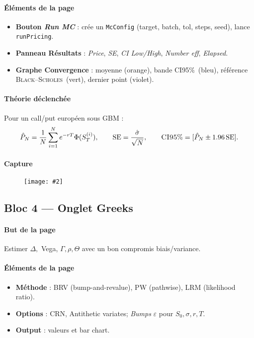 \documentclass[11pt,a4paper]{article}
\newcommand{\code}[1]{\texttt{#1}}
\newcommand{\imgfull}[2][\textwidth]{\begin{figure}[H]\centering\texttt{[image: \#2]}\end{figure}}
\newcommand{\bs}{\textsc{Black--Scholes}}
\newcommand{\ci}{\textsc{CI95}\%}
\begin{document}
\paragraph{Éléments de la page}
\begin{itemize}[leftmargin=*]
  \item \textbf{Bouton \emph{Run MC}} : crée un \code{McConfig} (target, batch, tol, steps, seed), lance \code{runPricing}.
  \item \textbf{Panneau Résultats} : \emph{Price}, \emph{SE}, \emph{CI Low/High}, \emph{Number eff}, \emph{Elapsed}.
  \item \textbf{Graphe Convergence} : moyenne (orange), bande \ci\ (bleu), référence \bs\ (vert), dernier point (violet).
\end{itemize}

\paragraph{Théorie déclenchée}
Pour un call/put européen sous GBM :
\[
\hat{P}_N=\frac{1}{N}\sum_{i=1}^N e^{-rT}\Phi(S_T^{(i)}),\qquad
\mathrm{SE}=\frac{\hat{\sigma}}{\sqrt{N}},\qquad
\text{\ci}=[\hat{P}_N\pm 1.96\,\mathrm{SE}].
\]

\paragraph{Capture} \imgfull{pricing.png}

\subsection*{Bloc 4 — Onglet Greeks}
\paragraph{But de la page} Estimer \(\Delta,\) Vega, \(\Gamma,\rho,\Theta\) avec un bon compromis biais/variance.

\paragraph{Éléments de la page}
\begin{itemize}[leftmargin=*]
  \item \textbf{Méthode} : BRV (bump-and-revalue), PW (pathwise), LRM (likelihood ratio).
  \item \textbf{Options} : CRN, Antithetic variates; \emph{Bumps} \(\varepsilon\) pour \(S_0,\sigma,r,T\).
  \item \textbf{Output} : valeurs et bar chart.
\end{itemize}
\end{document}
